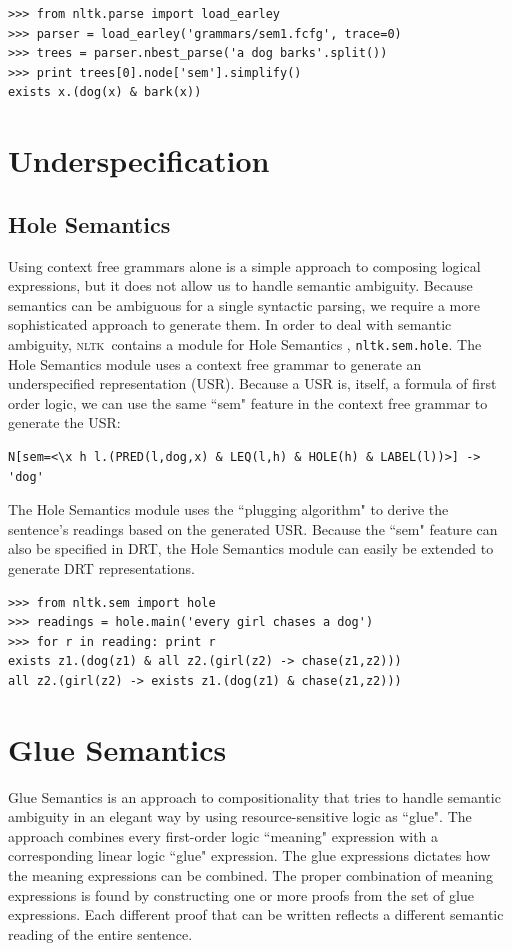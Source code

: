 \documentclass[11pt,a4paper]{article}
\newcommand{\NLTK}{\textsc{nltk}}
\newcommand{\dhgcode}[1]{{\tt #1}}
\begin{document}
\begin{verbatim}
>>> from nltk.parse import load_earley
>>> parser = load_earley('grammars/sem1.fcfg', trace=0)
>>> trees = parser.nbest_parse('a dog barks'.split())
>>> print trees[0].node['sem'].simplify()
exists x.(dog(x) & bark(x))
\end{verbatim}

\section{Underspecification}

\subsection{Hole Semantics}
Using context free grammars alone is a simple approach to composing logical expressions, but it does not allow us to handle semantic ambiguity.  Because semantics can be ambiguous for a single syntactic parsing, we require a more sophisticated approach to generate them.  In order to deal with semantic ambiguity, \NLTK\ contains a module for Hole Semantics \cite{BB}, \dhgcode{nltk.sem.hole}.  The Hole Semantics module uses a context free grammar to generate an underspecified representation (USR).  Because a USR is, itself, a formula of first order logic, we can use the same ``sem" feature in the context free grammar to generate the USR:

\small
\begin{verbatim}
N[sem=<\x h l.(PRED(l,dog,x) & LEQ(l,h) & HOLE(h) & LABEL(l))>] -> 'dog'
\end{verbatim}
\normalsize

The Hole Semantics module uses the ``plugging algorithm" to derive the sentence's readings based on the generated USR.  Because the ``sem" feature can also be specified in DRT, the Hole Semantics module can easily be extended to generate DRT representations.

\begin{verbatim}
>>> from nltk.sem import hole
>>> readings = hole.main('every girl chases a dog')
>>> for r in reading: print r
exists z1.(dog(z1) & all z2.(girl(z2) -> chase(z1,z2)))
all z2.(girl(z2) -> exists z1.(dog(z1) & chase(z1,z2)))
\end{verbatim}


\section{Glue Semantics}
Glue Semantics is an approach to compositionality that tries to handle
semantic ambiguity in an elegant way by using resource-sensitive logic
as ``glue".  The approach combines every first-order logic ``meaning"
expression with a corresponding linear logic ``glue" expression.  The
glue expressions dictates how the meaning expressions can be combined.
The proper combination of meaning expressions is found by constructing
one or more proofs from the set of glue expressions.  Each different
proof that can be written reflects a different semantic reading of the
entire sentence.   
\end{document}
